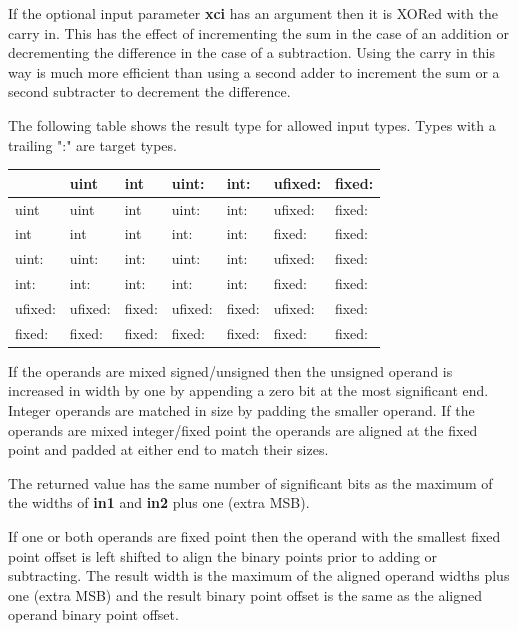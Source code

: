         If the optional input parameter {\bf xci} has an argument then it is XORed
        with the carry in. This has the effect of incrementing the sum in the case
        of an addition or decrementing the difference in the case of a subtraction.
        Using the carry in this way is much more efficient than using a second
        adder to increment the sum or a second subtracter to decrement the
        difference.
        
        The following table shows the result type for allowed input types.
        Types with a trailing ":" are target types.

        \begin{tabular}{| l || l | l | l | l | l | l |}
        \hline
                & uint    & int    & uint:   & int:   & ufixed: & fixed: \\
        \hline \hline
        uint    & uint    & int    & uint:   & int:   & ufixed: & fixed: \\ \hline
        int     & int     & int    & int:    & int:   & fixed:  & fixed: \\ \hline
        uint:   & uint:   & int:   & uint:   & int:   & ufixed: & fixed: \\ \hline
        int:    & int:    & int:   & int:    & int:   & fixed:  & fixed: \\ \hline
        ufixed: & ufixed: & fixed: & ufixed: & fixed: & ufixed: & fixed: \\ \hline
        fixed:  & fixed:  & fixed: & fixed:  & fixed: & fixed:  & fixed: \\ \hline
        \end{tabular}
        
        If the operands are mixed signed/unsigned then the unsigned operand is
        increased in width by one by appending a zero bit at the most significant
        end. Integer operands are matched in size by padding the smaller operand.
        If the operands are mixed integer/fixed point the operands are aligned at
        the fixed point and padded at either end to match their sizes.

        The returned value has the same number of significant bits as the maximum
        of the widths of {\bf in1} and {\bf in2} plus one (extra MSB).
        
        If one or both operands are fixed point then the operand with the smallest
        fixed point offset is left shifted to align the binary points prior to
        adding or subtracting. The result width is the maximum of the aligned
        operand widths plus one (extra MSB) and the result binary point offset is
        the same as the aligned operand binary point offset.
        
